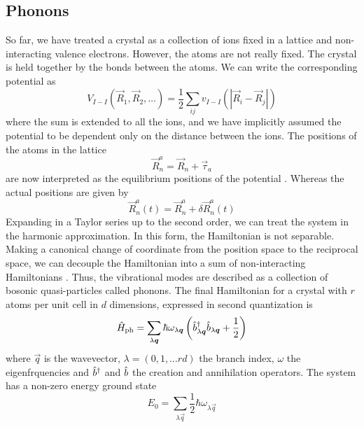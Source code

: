 \subsection{Phonons} \label{sec:phonons}
So far, we have treated a crystal as a collection of ions fixed in a lattice and non-interacting valence electrons. However, the atoms are not really fixed. The crystal is held together by the bonds between the atoms. We can write the corresponding potential as
\begin{equation} \label{eq:ion_ion_potential}
    V_{I-I}(\vec{R}_1, \vec{R}_2, \dots) = \frac{1}{2} \sum_{ij} v_{I-I}(|\vec{R}_i - \vec{R}_j|)
\end{equation}
where the sum is extended to all the ions, and we have implicitly assumed the potential to be dependent only on the distance between the ions. The positions of the atoms in the lattice
\begin{equation}
    \vec{R}_n^a = \vec{R}_n + \vec{\tau}_a
\end{equation}
are now interpreted as the equilibrium positions of the potential . Whereas the actual positions are given by
\begin{equation} \label{eq:atom_position_perturbed}
    \vec{R}_n^a(t) = \vec{R}_n^a + \delta \vec{R}_n^a(t)
\end{equation}
Expanding  in a Taylor series up to the second order, we can treat the system in the harmonic approximation. In this form, the Hamiltonian is not separable. Making a canonical change of coordinate from the position space to the reciprocal space, we can decouple the Hamiltonian into a sum of non-interacting Hamiltonians \cite{cohenFundamentalsCondensedMatter}. Thus, the vibrational modes are described as a collection of bosonic quasi-particles called phonons. The final Hamiltonian for a crystal with $r$ atoms per unit cell in $d$ dimensions, expressed in second quantization is
\begin{equation} \label{eq:phonon_hamiltonian}
    \hat{H}_\text{ph} = \sum_{\lambda \mathbf{\boldsymbol{q}}} \hbar \omega_{\lambda\mathbf{\boldsymbol{q}}} \left( \hat{b}^\dagger_{\lambda \mathbf{\boldsymbol{q}}} \hat{b}_{\lambda \mathbf{\boldsymbol{q}}} + \frac{1}{2} \right)
\end{equation}
where $\vec{q}$ is the wavevector, $\lambda = (0,1,\dots rd)$ the branch index, $\omega$ the eigenfrquencies and $\hat{b}^\dagger$ and $\hat{b}$ the creation and annihilation operators. The system has a non-zero energy ground state
\begin{equation}
    E_0 = \sum_{\lambda \vec{q}} \frac{1}{2} \hbar\omega_{\lambda\vec{q}}
\end{equation}

